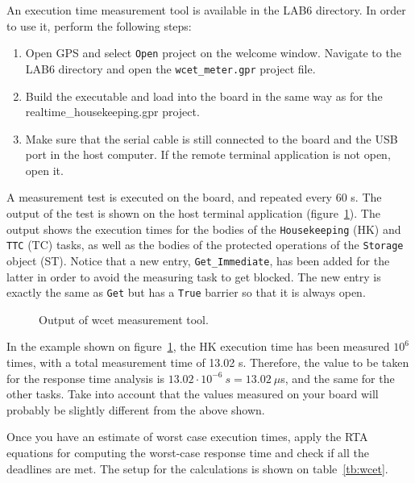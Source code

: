 An execution time measurement tool is available in the LAB6 directory. In order to use it, perform the following steps:
\begin{enumerate}
\item Open GPS and select {\tt Open} project on the welcome window. Navigate to the LAB6 directory and open the {\tt wcet\_meter.gpr} project file.
\item Build the executable and load into the board in the same way as for the realtime\_housekeeping.gpr project.
\item Make sure that the serial cable is still connected to the board and the USB port in the host computer. If the remote terminal application is not open, open it.
\end{enumerate}

A measurement test is executed on the board, and repeated every 60 s. The output of the test is shown on the host terminal application (figure~\ref{fig:wcet}). The output shows the execution times for the bodies of the {\tt Housekeeping} (HK) and {\tt TTC} (TC) tasks, as well as the bodies of the protected operations of the {\tt Storage} object (ST). Notice that a new entry, {\tt Get\_Immediate}, has been added for the latter in order to avoid the measuring task to get blocked. The new entry is exactly the same as {\tt Get} but has a {\tt True} barrier so that it is always open.

\begin{figure}[h]
            \caption{Output of wcet measurement tool.}
            \label{fig:wcet}
\end{figure}

In the example shown on figure~\ref{fig:wcet}, the HK execution time has been measured $10^{6}$ times, with a total measurement time of 13.02 s. Therefore, the value to be taken for the response time analysis is $13.02\cdot10^{-6}~s = 13.02~\mu${s}, and the same for the other tasks. Take into account that the values measured on your board will probably be slightly different from the above shown.

Once you have an estimate of worst case execution times, apply the RTA equations for computing the worst-case response time and check if all the deadlines are met. The setup for the calculations is shown on table~\ref{tb:wcet}.

